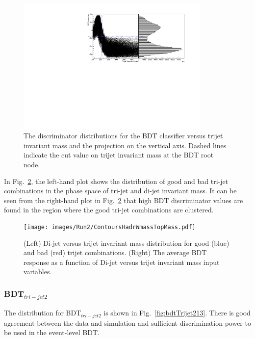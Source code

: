 \begin{figure}[ht!]
\begin{center}
    \includegraphics[width=0.85\textwidth]{images/Run2/multimode.pdf}
    \caption{The discriminator distributions for the BDT classifier versus trijet invariant mass and the projection on the vertical axis. Dashed lines indicate the cut value on trijet invariant mass at the BDT root node.}
    \label{fig:multimode13}
\end{center}
\end{figure}

In Fig.~\ref{fig:ContoursTopMassHadrWmass13}, the left-hand plot shows the distribution of good and bad tri-jet combinations in the phase space of tri-jet and di-jet invariant mass. It can be seen from the right-hand plot in Fig.~\ref{fig:ContoursTopMassHadrWmass13} that high BDT discriminator values are found in the region where the good tri-jet combinations are clustered.
\begin{figure}[ht!]
\begin{center}
    \texttt{[image: images/Run2/ContoursHadrWmassTopMass.pdf]}
    \caption{(Left)  Di-jet versus trijet invariant mass distribution for good (blue) and bad (red) trijet combinations. (Right) The average BDT response as a function of Di-jet versus trijet invariant mass input variables.}
    \label{fig:ContoursTopMassHadrWmass13}
\end{center}
\end{figure}

\subsubsection*{BDT$_{tri-jet2}$}

The distribution for BDT$_{tri-jet2}$ is shown in Fig.~\ref{fig:bdtTrijet213}. There is good agreement between the data and simulation and sufficient discrimination power to be used in the event-level BDT.

